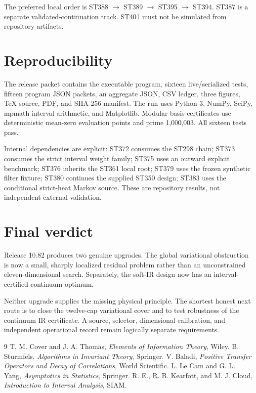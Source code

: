 \documentclass[11pt,a4paper]{article}
\begin{document}
The preferred local order is ST388 $\rightarrow$ ST389 $\rightarrow$ ST395
$\rightarrow$ ST394. ST387 is a separate validated-continuation track. ST401 must not be
simulated from repository artifacts.

\section{Reproducibility}

The release packet contains the executable program, sixteen live/serialized tests, fifteen
program JSON packets, an aggregate JSON, CSV ledger, three figures, TeX source, PDF, and
SHA-256 manifest. The run uses Python 3, NumPy, SciPy, mpmath interval arithmetic, and
Matplotlib. Modular basis certificates use deterministic mean-zero evaluation points and
prime 1,000,003. All sixteen tests pass.

Internal dependencies are explicit: ST372 consumes the ST298 chain; ST373 consumes the
strict interval weight family; ST375 uses an outward explicit benchmark; ST376 inherits the
ST361 local root; ST379 uses the frozen synthetic filter fixture; ST380 continues the
supplied ST350 design; ST383 uses the conditional strict-heat Markov source. These are
repository results, not independent external validation.

\section{Final verdict}

Release 10.82 produces two genuine upgrades. The global variational obstruction is now a
small, sharply localized residual problem rather than an unconstrained eleven-dimensional
search. Separately, the soft-IR design now has an interval-certified continuum optimum.

Neither upgrade supplies the missing physical principle. The shortest honest next route is
to close the twelve-cap variational cover and to test robustness of the continuum IR
certificate. A source, selector, dimensional calibration, and independent operational
record remain logically separate requirements.

\begin{thebibliography}{9}
 T. M. Cover and J. A. Thomas, \emph{Elements of Information Theory}, Wiley.
 B. Sturmfels, \emph{Algorithms in Invariant Theory}, Springer.
 V. Baladi, \emph{Positive Transfer Operators and Decay of Correlations}, World Scientific.
 L. Le Cam and G. L. Yang, \emph{Asymptotics in Statistics}, Springer.
 R. E., R. B. Kearfott, and M. J. Cloud, \emph{Introduction to Interval Analysis}, SIAM.
\end{thebibliography}
\end{document}

